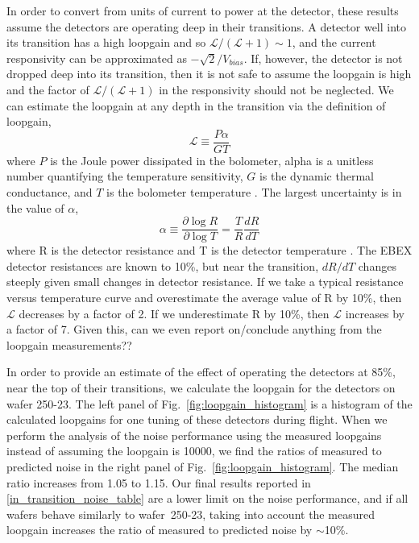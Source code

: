 In order to convert from units of current to power at the detector, these results assume the detectors are operating deep in their transitions. 
A detector well into its transition has a high loopgain and so $\mathcal{L}/(\mathcal{L} + 1) \sim 1$, and the current responsivity can be approximated as $-\sqrt{2}/V_{bias}$. 
If, however, the detector is not dropped deep into its transition, then it is not safe to assume the loopgain is high and the factor of  $\mathcal{L}/(\mathcal{L} + 1)$ in the responsivity should not be neglected. 
We can estimate the loopgain at any depth in the transition via the definition of loopgain, 
\begin{equation}
\mathcal{L} \equiv \frac{P\alpha}{GT}
\end{equation}
where $P$ is the Joule power dissipated in the bolometer, alpha is a unitless number quantifying the temperature sensitivity, $G$ is the dynamic thermal conductance, and $T$ is the bolometer temperature \citep{irwin_book_2005}. 
The largest uncertainty is in the value of $\alpha$, 
 \begin{equation}
 \alpha \equiv \frac{\partial \log R}{\partial \log T}=\frac{T}{R} \frac{dR}{dT}
 \end{equation}
 where R is the detector resistance and T is the detector temperature \citep{irwin_book_2005}. 
The \ac{EBEX} detector resistances are known to 10\%, but near the transition, $dR/dT$ changes steeply given small changes in detector resistance. 
If we take a typical resistance versus temperature curve and overestimate the average value of R by 10\%, then $\mathcal{L}$ decreases by a factor of 2.
If we underestimate R by 10\%, then $\mathcal{L}$ increases by a factor of 7. 
Given this, can we even report on/conclude anything from the loopgain measurements??

In order to provide an estimate of the effect of operating the detectors at 85\%, near the top of their transitions, we calculate the loopgain for the detectors on wafer 250-23. 
The left panel of Fig.~\ref{fig:loopgain_histogram} is a histogram of the calculated loopgains for one tuning of these detectors during flight. 
When we perform the analysis of the noise performance using the measured loopgains instead of assuming the loopgain is 10000, we find the ratios of measured to predicted noise in the right panel of Fig.~\ref{fig:loopgain_histogram}. 
The median ratio increases from 1.05 to 1.15. 
Our final results reported in \TAB\ref{in_transition_noise_table} are a lower limit on the noise performance, and if all wafers behave similarly to wafer~250-23, taking into account the measured loopgain increases the ratio of measured to predicted noise by $\sim$10\%. 


